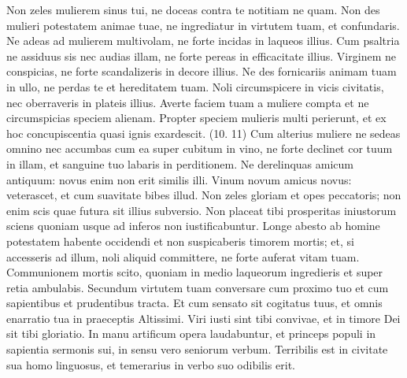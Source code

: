 \begin{biblechapter}  
\verse Non zeles mulierem sinus tui, ne doceas contra te notitiam ne quam. 
\verse Non des mulieri potestatem animae tuae, ne ingrediatur in virtutem tuam, et confundaris. 
\verse Ne adeas ad mulierem multivolam, ne forte incidas in laqueos illius. 
\verse Cum psaltria ne assiduus sis nec audias illam, ne forte pereas in efficacitate illius. 
\verse Virginem ne conspicias, ne forte scandalizeris in decore illius. 
\verse Ne des fornicariis animam tuam in ullo, ne perdas te et hereditatem tuam. 
\verse Noli circumspicere in vicis civitatis, nec oberraveris in plateis illius. 
\verse Averte faciem tuam a muliere compta et ne circumspicias speciem alienam. 
\verse Propter speciem mulieris multi perierunt, et ex hoc concupiscentia quasi ignis exardescit. (10. 11) 
\verse Cum alterius muliere ne sedeas omnino nec accumbas cum ea super cubitum in vino, 
\verse ne forte declinet cor tuum in illam, et sanguine tuo labaris in perditionem. 
\verse Ne derelinquas amicum antiquum: novus enim non erit similis illi. 
\verse Vinum novum amicus novus: veterascet, et cum suavitate bibes illud. 
\verse Non zeles gloriam et opes peccatoris; non enim scis quae futura sit illius subversio. 
\verse Non placeat tibi prosperitas iniustorum sciens quoniam usque ad inferos non iustificabuntur. 
\verse Longe abesto ab homine potestatem habente occidendi et non suspicaberis timorem mortis; 
\verse et, si accesseris ad illum, noli aliquid committere, ne forte auferat vitam tuam. 
\verse Communionem mortis scito, quoniam in medio laqueorum ingredieris et super retia ambulabis. 
\verse Secundum virtutem tuam conversare cum proximo tuo et cum sapientibus et prudentibus tracta. 
\verse Et cum sensato sit cogitatus tuus, et omnis enarratio tua in praeceptis Altissimi. 
\verse Viri iusti sint tibi convivae, et in timore Dei sit tibi gloriatio. 
\verse In manu artificum opera laudabuntur, et princeps populi in sapientia sermonis sui, in sensu vero seniorum verbum. 
\verse Terribilis est in civitate sua homo linguosus, et temerarius in verbo suo odibilis erit. 
\end{biblechapter}

